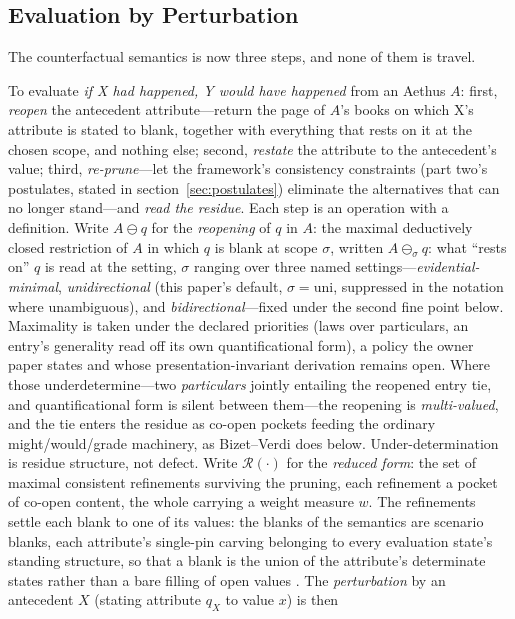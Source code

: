 \documentclass[11pt]{article}
\theoremstyle{definition}
\newcommand{\Aethus}{Aethus}
\begin{document}
\subsection{Evaluation by Perturbation}\label{sec:perturbation}

The counterfactual semantics is now three steps, and none of them is travel.

To evaluate \emph{if X had happened, Y would have happened} from an \Aethus{} $A$: first, \emph{reopen} the antecedent attribute---return the page of $A$'s books on which X's attribute is stated to blank, together with everything that rests on it at the chosen scope, and nothing else; second, \emph{restate} the attribute to the antecedent's value; third, \emph{re-prune}---let the framework's consistency constraints (part two's postulates, stated in section~\ref{sec:postulates}) eliminate the alternatives that can no longer stand---and \emph{read the residue}. Each step is an operation with a definition. Write $A \ominus q$ for the \emph{reopening} of $q$ in $A$: the maximal deductively closed restriction of $A$ in which $q$ is blank at scope $\sigma$, written $A \ominus_{\sigma} q$: what ``rests on'' $q$ is read at the setting, $\sigma$ ranging over three named settings---\emph{evidential-minimal}, \emph{unidirectional} (this paper's default, $\sigma = \mathrm{uni}$, suppressed in the notation where unambiguous), and \emph{bidirectional}---fixed under the second fine point below. Maximality is taken under the declared priorities (laws over particulars, an entry's generality read off its own quantificational form), a policy the owner paper states and whose presentation-invariant derivation remains open. Where those underdetermine---two \emph{particulars} jointly entailing the reopened entry tie, and quantificational form is silent between them---the reopening is \emph{multi-valued}, and the tie enters the residue as co-open pockets feeding the ordinary might/would/grade machinery, as Bizet--Verdi does below. Under-determination is residue structure, not defect. Write $\mathcal{R}(\cdot)$ for the \emph{reduced form}: the set of maximal consistent refinements surviving the pruning, each refinement a pocket of co-open content, the whole carrying a weight measure $w$. The refinements settle each blank to one of its values: the blanks of the semantics are scenario blanks, each attribute's single-pin carving belonging to every evaluation state's standing structure, so that a blank is the union of the attribute's determinate states rather than a bare filling of open values \cite{AethusSemantics}. The \emph{perturbation} by an antecedent $X$ (stating attribute $q_X$ to value $x$) is then
\end{document}
